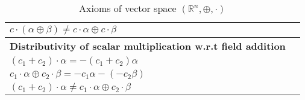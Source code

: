\documentclass[journal,12pt,twocolumn]{IEEEtran}
\begin{document}
\begin{table*}[h!]
\begin{center}
\begin{tabular}{|l|l|}
$c\cdot(\alpha\oplus\beta)\neq c\cdot\alpha\oplus c\cdot\beta$&\\[0.5ex]\hline
\textbf{Distributivity of scalar multiplication w.r.t field addition}&\\
$(c_1+c_2)\cdot\alpha=-(c_1+c_2)\alpha$&\\
$c_1\cdot\alpha\oplus c_2\cdot\beta=-c_1\alpha-(-c_2\beta)$&\\
$(c_1+c_2)\cdot\alpha\neq c_1\cdot\alpha\oplus c_2\cdot\beta$&\\[0.5ex]\hline
\end{tabular}
\caption{Axioms of vector space $(\mathbb{R}^n,\oplus,\cdot)$ }
\label{table:1}
\end{center}
\vspace{-0.5cm}
\end{table*}
\end{document}
